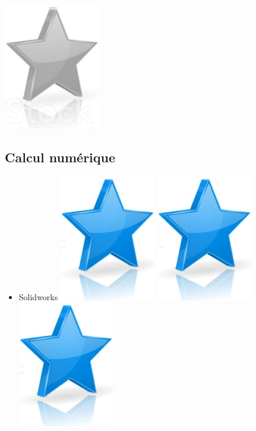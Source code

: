\documentclass[10pt,a4paper,sans]{article}
\begin{document}
\begin{minipage}[t]{0.26\textwidth}
\begin{mdframed}[style=cadreCompetences]
\begin{itemize}
{                    \includegraphics[scale=0.20]{img/empty_star.png}}
        \end{itemize}

        \subsection{Calcul numérique}
            \begin{itemize}
                \item{Solidworks
                    \hfill
                    \includegraphics[scale=0.20]{img/star.png} \hspace{-0.2cm}
                    \includegraphics[scale=0.20]{img/star.png} \hspace{-0.2cm}
                    \includegraphics[scale=0.20]{img/star.png} \hspace{-0.2cm}
}
\end{itemize}
\end{mdframed}
\end{minipage}
\end{document}
